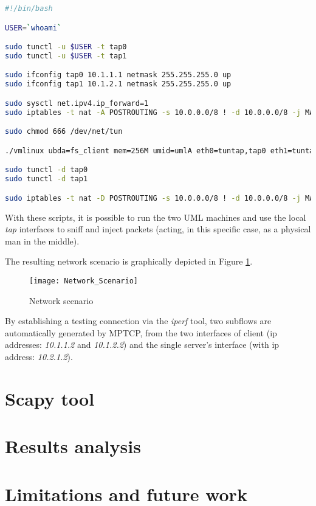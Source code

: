 \begin{lstlisting}[language=bash, caption=\textit{client.sh}]
#!/bin/bash

USER=`whoami`

sudo tunctl -u $USER -t tap0
sudo tunctl -u $USER -t tap1

sudo ifconfig tap0 10.1.1.1 netmask 255.255.255.0 up
sudo ifconfig tap1 10.1.2.1 netmask 255.255.255.0 up

sudo sysctl net.ipv4.ip_forward=1
sudo iptables -t nat -A POSTROUTING -s 10.0.0.0/8 ! -d 10.0.0.0/8 -j MASQUERADE

sudo chmod 666 /dev/net/tun

./vmlinux ubda=fs_client mem=256M umid=umlA eth0=tuntap,tap0 eth1=tuntap,tap1

sudo tunctl -d tap0
sudo tunctl -d tap1

sudo iptables -t nat -D POSTROUTING -s 10.0.0.0/8 ! -d 10.0.0.0/8 -j MASQUERADE
\end{lstlisting}

With these scripts, it is possible to run the two UML machines and use the local \textit{tap} interfaces to sniff and inject packets (acting, in this specific case, as a physical man in the middle).

The resulting network scenario is graphically depicted in Figure \ref{fig:networkscenario}.

\begin{figure}[!htb]
\centering
\texttt{[image: Network\_Scenario]}
\caption{Network scenario}
\label{fig:networkscenario}
\end{figure}

By establishing a testing connection via the \textit{iperf} tool, two subflows are automatically generated by MPTCP, from the two interfaces of client (ip addresses: \textit{10.1.1.2} and \textit{10.1.2.2}) and the single server's interface (with ip address: \textit{10.2.1.2}).

\section{Scapy tool}


\section{Results analysis}
\section{Limitations and future work}

